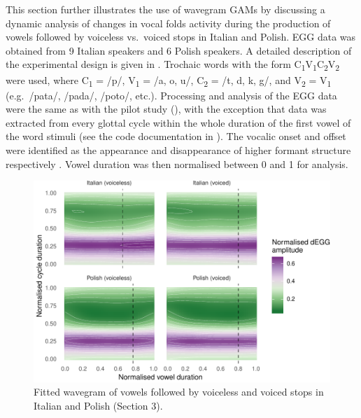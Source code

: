 \documentclass[
  11pt,
  a4paper,
]{article}
\begin{document}
\label{s:voicing}

This section further illustrates the use of wavegram GAMs by discussing
a dynamic analysis of changes in vocal folds activity during the
production of vowels followed by voiceless vs.~voiced stops in Italian
and Polish. EGG data was obtained from 9 Italian speakers and 6 Polish
speakers. A detailed description of the experimental design is given in
\citet{coretta2018j}. Trochaic words with the form
C\textsubscript{1}V\textsubscript{1}C\textsubscript{2}V\textsubscript{2}
were used, where C\textsubscript{1} = /p/, V\textsubscript{1} = /a, o,
u/, C\textsubscript{2} = /t, d, k, g/, and V\textsubscript{2} =
V\textsubscript{1} (e.g.~/pata/, /pada/, /poto/, etc.). Processing and
analysis of the EGG data were the same as with the pilot study
(), with the exception that data was extracted from every
glottal cycle within the whole duration of the first vowel of the word
stimuli (see the code documentation in ). The vocalic onset and offset
were identified as the appearance and disappearance of higher formant
structure respectively \citep{machac2009}. Vowel duration was then
normalised between 0 and 1 for analysis.

\begin{figure}
\includegraphics[width=\linewidth]{2019-wavegram_files/figure-latex/surface-1} \caption{Fitted wavegram of vowels followed by voiceless and voiced stops in Italian and Polish (Section 3).}\label{f:surface}
\end{figure}
\end{document}
